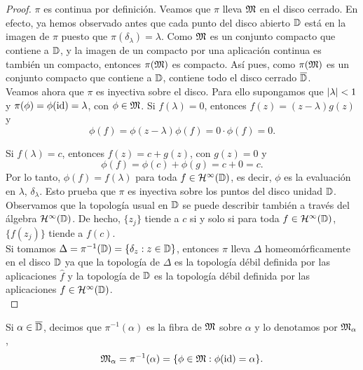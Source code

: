 \begin{proof}
$\pi$ es continua por definición. Veamos que $\pi$ lleva $\mathfrak{M}$ en el disco cerrado. En efecto, ya hemos observado antes que cada punto del disco abierto $\mathbb{D}$ está en la imagen de $\pi$ puesto que $\pi (\delta_\lambda) = \lambda$. Como $\mathfrak{M}$ es un conjunto compacto que contiene a $\mathbb{D}$, y la imagen de un compacto por una aplicación continua es también un compacto, entonces $\pi(\mathfrak{M})$ es compacto. Así pues, como $\pi(\mathfrak{M})$ es un conjunto compacto que contiene a $\mathbb{D}$, contiene todo el disco cerrado $\overline{\mathbb{D}}$. \\

Veamos ahora que $\pi$ es inyectiva sobre el disco. Para ello supongamos que $\left\lvert\lambda\right\rvert < 1$ y $\pi (\phi) = \phi (\operatorname{id}) = \lambda$, con $\phi \in \mathfrak{M}$. Si $f(\lambda) = 0$, entonces $f(z) = (z - \lambda) g(z)$ y
\begin{equation*}
    \phi(f) = \phi(z - \lambda) \phi(f) = 0 \cdot \phi(f) = 0.
\end{equation*}

Si $f(\lambda) = c$, entonces $f(z) = c + g(z)$, con $g(z) = 0$ y
\begin{equation*}
    \phi(f) = \phi(c) + \phi(g) = c + 0 = c.
\end{equation*}
Por lo tanto, $\phi(f) = f(\lambda)$ para toda $f \in \mathcal{H}^{\infty}(\mathbb{D})$, es decir, $\phi$ es la evaluación en $\lambda$, $\delta_\lambda$. Esto prueba que $\pi$ es inyectiva sobre los puntos del disco unidad $\mathbb{D}$. \\

Observamos que la topología usual en $\mathbb{D}$ se puede describir también a través del álgebra $\mathcal{H}^{\infty}(\mathbb{D})$. De hecho, $\{z_j\}$ tiende a $c$ si y solo si para toda $f \in \mathcal{H}^{\infty}(\mathbb{D})$, $\{f(z_j)\}$ tiende a $f(c)$. \\

Si tomamos $\Delta = \pi^{-1} (\mathbb{D}) = \{\delta_z : z \in \mathbb{D}\}$, entonces $\pi$ lleva $\Delta$ homeomórficamente en el disco $\mathbb{D}$ ya que la topología de $\Delta$ es la topología débil definida por las aplicaciones $\widehat f$ y la topología de $\mathbb{D}$ es la topología débil definida por las aplicaciones $f \in \mathcal{H}^{\infty}(\mathbb{D})$. \\
\end{proof}

\begin{definition}
    \label{def:fibra}
    Si $\alpha \in \overline{\mathbb{D}}$, decimos que $\pi^{-1} (\alpha)$ es la fibra de $\mathfrak{M}$ sobre $\alpha$ y lo denotamos por $\mathfrak{M}_\alpha$,
    \begin{equation*}
        \mathfrak{M}_\alpha = \pi^{-1} (\alpha) = \{\phi \in \mathfrak{M} : \phi (\operatorname{id}) = \alpha\}.
    \end{equation*}
\end{definition}

